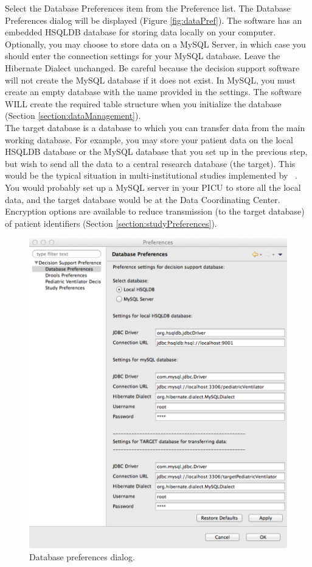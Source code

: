 Select the Database Preferences  item from the Preference list.  The Database Preferences dialog will be displayed (Figure \vref{fig:dataPref}).  
The software has an embedded HSQLDB database for storing data locally on your computer.  Optionally, you may
choose to store data on a MySQL Server, in which case you should enter the connection settings for your
MySQL database.  Leave the Hibernate Dialect unchanged.  Be careful because the decision support software will not
create the MySQL database if it does not exist.  In MySQL, you must create an empty database with the name provided in
the settings.  The software WILL create the required table structure when you initialize the database (Section \vref{section:dataManagement}).\\

The target database is a database to which you can transfer data from the main working database.  For example, you may
store your patient data on the local HSQLDB database or the MySQL database that you set up in the previous step, but
wish to send all the data to a central research database (the target).  This would be the typical situation in
multi-institutional studies implemented by \abb~.  You would probably set up a MySQL server in your PICU to store all
the local data, and the target database would be at the Data Coordinating Center.  Encryption options are available to 
reduce transmission (to the target database) of patient identifiers (Section \vref{section:studyPreferences}).\\

\begin{figure}[htbp] 
   \centering
   \includegraphics[width=\textwidth]{DatabasePreferences} 
   \caption{Database preferences dialog.}
   \label{fig:dataPref}
\end{figure}


